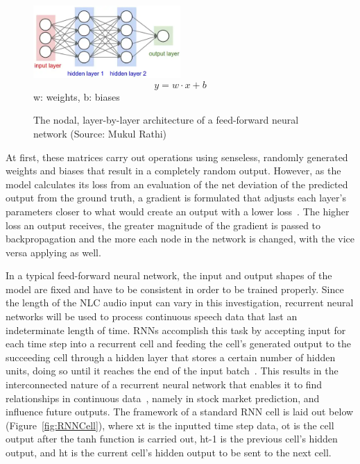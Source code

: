 \begin{figure}[th]
    \centering
    \includegraphics[width=0.5\textwidth]{Figures/neuralnet.png}
    \[ y = w\cdot{x} + b \]
    w: weights, b: biases
    \decoRule
    \caption[Feed Forward Neural Network]{The nodal, layer-by-layer architecture of a feed-forward neural network (Source: Mukul Rathi)}
    \label{fig:FeedForwardNN}
\end{figure}

At first, these matrices carry out operations using senseless, randomly generated weights and biases that result in a completely random output. However, as the model calculates its loss from an evaluation of the net deviation of the predicted output from the ground truth, a gradient is formulated that adjusts each layer’s parameters closer to what would create an output with a lower loss~\cite{koehn_2020}. The higher loss an output receives, the greater magnitude of the gradient is passed to backpropagation and the more each node in the network is changed, with the vice versa applying as well.
\par
In a typical feed-forward neural network, the input and output shapes of the model are fixed and have to be consistent in order to be trained properly. Since the length of the NLC audio input can vary in this investigation, recurrent neural networks will be used to process continuous speech data that last an indeterminate length of time. RNNs accomplish this task by accepting input for each time step into a recurrent cell and feeding the cell’s generated output to the succeeding cell through a hidden layer that stores a certain number of hidden units, doing so until it reaches the end of the input batch~\cite{graves_mohamed_hinton_2013,koehn_2020}. This results in the interconnected nature of a recurrent neural network that enables it to find relationships in continuous data~\cite{ibm_cloud_education_2020}, namely in stock market prediction, and influence future outputs. The framework of a standard RNN cell is laid out below (Figure~\ref{fig:RNNCell}), where xt is the inputted time step data, ot is the cell output after the tanh function is carried out, ht-1 is the previous cell’s hidden output, and ht is the current cell’s hidden output to be sent to the next cell.

